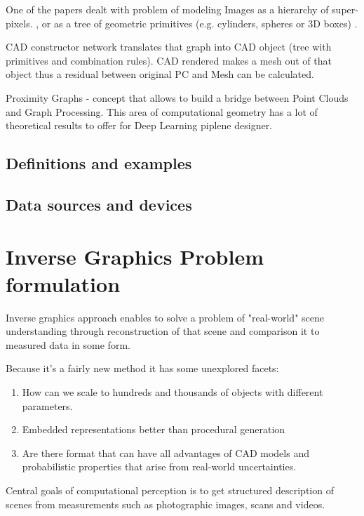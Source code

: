 One of the papers dealt with problem of modeling Images as a hierarchy of super-pixels. \cite{russell2009associative}, or as a tree of geometric primitives (e.g. cylinders, spheres or 3D boxes) \cite{li2017grass}.

CAD constructor network translates that graph into CAD object (tree with primitives and combination rules). CAD rendered makes a mesh out of that object thus a residual between original PC and Mesh can be calculated.

Proximity Graphs - concept that allows to build a bridge between Point Clouds and Graph Processing. This area of computational geometry has a lot of theoretical results to offer for Deep Learning piplene designer.


\subsection{Definitions and examples}
\subsection{Data sources and devices}

\section{Inverse Graphics Problem formulation}

\cite{rezende2016unsupervised,eslami2016attend,kulkarni2015deep,wu20153d,izadinia2017im2cad}

Inverse graphics approach enables to solve a problem of "real-world" scene understanding through reconstruction of that scene and comparison it to measured data in some form.

Because it's a fairly new method it has some unexplored facets:
\begin{enumerate}
    \item How can we scale to hundreds and thousands of objects with different parameters.
    \item Embedded representations better than procedural generation
    \item Are there format that can have all advantages of CAD models and probabilistic properties that arise from real-world uncertainties.
\end{enumerate}

Central goals of computational perception is to get structured description of scenes from measurements such as photographic images, scans and videos.

